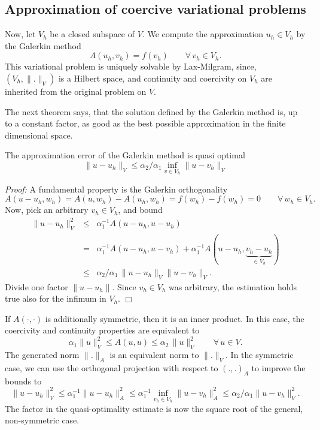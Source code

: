 \subsection{Approximation of coercive variational problems}
Now, let $V_h$ be a closed subspace of $V$. We compute the
approximation $u_h \in V_h$ by the Galerkin method
\begin{equation}
A(u_h, v_h) = f(v_h) \qquad \forall \, v_h \in V_h.
\end{equation}
This variational problem is uniquely solvable by Lax-Milgram, 
since, $(V_h,\|.\|_V)$ is 
a Hilbert space, and continuity and coercivity on $V_h$ are inherited
from the original problem on $V$.


The next theorem says, that the solution defined by the Galerkin method is,
up to a constant factor, as good as the best possible approximation in the
finite dimensional space.

\begin{theorem}[Cea] The approximation error of the Galerkin method
is quasi optimal
$$
\| u - u_h \|_V \leq \alpha_2 / \alpha_1 \inf_{v \in V_h} \| u - v_h \|_V
$$
\end{theorem}
{\em Proof:} A fundamental property is the Galerkin orthogonality
$$
A(u-u_h, w_h) = A(u,w_h) - A(u_h, w_h) = f(w_h) - f(w_h) = 0
\qquad \forall \, w_h \in V_h.
$$
Now, pick an arbitrary $v_h \in V_h$, and bound
\begin{eqnarray*}
\| u - u_h \|_V^2 & \leq & \alpha_1^{-1} A(u-u_h, u-u_h) \\
& = & \alpha_1^{-1} A(u-u_h, u-v_h) + \alpha_1^{-1} A(u-u_h, \underbrace{v_h-u_h}_{\in V_h}) \\
& \leq &  \alpha_2 / \alpha_1 \, \| u - u_h \|_V \| u - v_h \|_V.
\end{eqnarray*}
Divide one factor $\|u - u_h\|$. Since $v_h \in V_h$ was arbitrary, the estimation
holds true also for the infimum in $V_h$.
\hfill $\Box$

\bigskip
If $A(\cdot,\cdot)$ is additionally symmetric, then it is an inner product. In this
case, the coercivity and continuity properties are equivalent to
$$
\alpha_1 \| u \|_V^2 \leq A(u,u) \leq \alpha_2 \, \| u \|_V^2
\qquad \forall \, u \in V.
$$
The generated norm $\|.\|_A$ is an equivalent norm to $\|.\|_V$. In the 
symmetric case, we can use the orthogonal projection with respect to 
$(.,.)_A$ to improve the bounds to
$$
\| u - u_h \|_V^2 \leq \alpha_1^{-1} \| u - u_h \|_A^2 \leq
        \alpha_1^{-1} \inf_{v_h \in V_h} \| u - v_h \|_A^2 \leq
        \alpha_2 / \alpha_1 \| u - v_h \|_V^2.
$$
The factor in the quasi-optimality estimate is now the square root of the
general, non-symmetric case.

